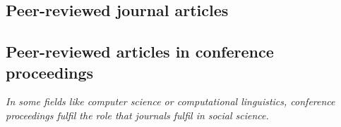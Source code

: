 \documentclass[11pt,a4paper,sans]{moderncv}
\begin{document}





\subsection{Peer-reviewed journal articles}

\makeatletter
\long{}
\def\endthebibliography{\end{etaremune}}
\def\@bibitem#1{%
  \item \if@filesw\immediate\write\@auxout{\string\bibcite{#1}{\the\value{enumi}}}\fi\ignorespaces
}
\makeatother



\subsection{Peer-reviewed articles in conference proceedings}
\emph{In some fields like computer science or computational linguistics, conference proceedings fulfil the role that journals fulfil in social science.}

\makeatletter
\long{}
\def\endthebibliography{\end{etaremune}}
\def\@bibitem#1{%
  \item \if@filesw\immediate\write\@auxout{\string\bibcite{#1}{\the\value{enumi}}}\fi\ignorespaces
}
\makeatother
\end{document}
